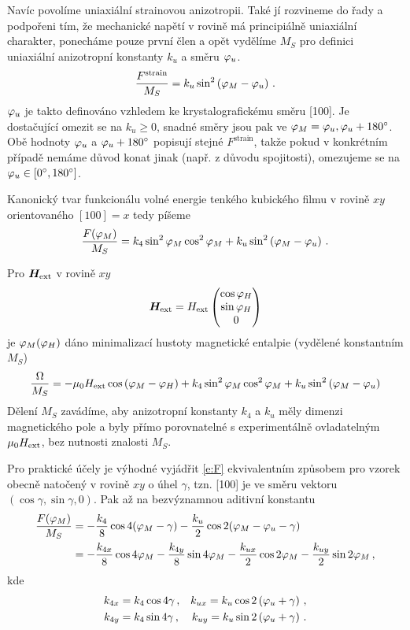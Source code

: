 Navíc povolíme uniaxiální strainovou anizotropii.
Také jí rozvineme do řady a podpořeni tím, že mechanické napětí v rovině má principiálně uniaxiální charakter, ponecháme pouze první člen a opět vydělíme $M_S$ pro definici uniaxiální anizotropní konstanty $k_u$ a směru $\varphi_u$.
\begin{equation}
    \frac{F^\textrm{strain}}{M_S}=k_u \sin^2\left( \varphi_M-\varphi_u  \right) \,.
\end{equation}
$\varphi_u$ je takto definováno vzhledem ke krystalografickému směru [100].
Je dostačující omezit se na $k_u\geq 0$, snadné směry jsou pak ve $\varphi_M=\varphi_u, \varphi_u+\SI{180}{\degree}$.
Obě hodnoty $\varphi_u$ a $\varphi_u+\SI{180}{\degree}$ popisují stejné $F^\textrm{strain}$, takže pokud v konkrétním případě nemáme důvod konat jinak (např. z důvodu spojitosti), omezujeme se na $\varphi_u \in [\SI{0}{\degree}, \SI{180}{\degree}]$.

Kanonický tvar funkcionálu volné energie tenkého kubického filmu v rovině $xy$ orientovaného $[100]=x$ tedy píšeme
\begin{equation}
\label{e:F}
    \frac{F(\varphi_M)}{M_S}=k_4 \sin^2 \varphi_M \cos^2 \varphi_M + k_u \sin^2\left( \varphi_M-\varphi_u  \right) \,.
\end{equation}

Pro $\bm{H}_\textrm{ext}$ v rovině $xy$
\begin{equation}
    \bm{H}_\textrm{ext} =H_\textrm{ext} \begin{pmatrix} \cos \varphi_H \\ \sin \varphi_H \\ 0 \end{pmatrix}
\end{equation}
je $\varphi_M(\varphi_H)$ dáno minimalizací hustoty magnetické entalpie (vydělené konstantním $M_S$)
\begin{equation}
\frac{\Omega}{M_S}=-\mu_0 H_\textrm{ext} \cos \left(\varphi_M-\varphi_H \right) + k_4 \sin^2 \varphi_M \cos^2 \varphi_M + k_u \sin^2\left( \varphi_M-\varphi_u  \right)
\end{equation}
Dělení $M_S$ zavádíme, aby anizotropní konstanty $k_4$ a $k_u$ měly dimenzi magnetického pole a byly přímo porovnatelné s experimentálně ovladatelným $\mu_0H_\textrm{ext}$, bez nutnosti znalosti $M_S$.

Pro praktické účely je výhodné vyjádřit \eqref{e:F} ekvivalentním způsobem pro vzorek obecně natočený v rovině $xy$ o úhel $\gamma$, tzn. [100] je ve směru vektoru $(\cos\gamma, \sin\gamma, 0)$.
Pak až na bezvýznamnou aditivní konstantu
\begin{align}
\label{eqn:funkcional-otoceny}
    \frac{F(\varphi_M)}{M_S}&=-\frac{k_4}{8} \cos 4(\varphi_M-\gamma)-\frac{k_u}{2} \cos 2(\varphi_M-\varphi_u-\gamma) \\
    &=-\frac{k_{4x}}{8} \cos 4\varphi_M - \frac{k_{4y}}{8} \sin 4\varphi_M - \frac{k_{ux}}{2} \cos 2 \varphi_M - \frac{k_{uy}}{2} \sin 2 \varphi_M \,,
\end{align}
kde
\begin{align}
    k_{4x}&=k_4 \cos 4\gamma \,, & k_{ux}=k_u \cos 2 \left(\varphi_u+\gamma\right) \,,\\
    k_{4y}&=k_4 \sin 4\gamma \,, & k_{uy}=k_u \sin 2 \left(\varphi_u+\gamma\right) \,.
\end{align}

